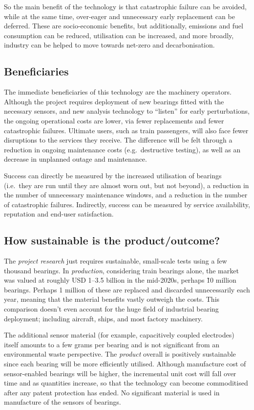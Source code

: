 \documentclass[runningheads]{llncs}
\begin{document}
    So the main benefit of the technology is that catastrophic failure can be avoided, while at the same time, over-eager and unnecessary early replacement can be deferred. These are socio-economic benefits, but additionally, emissions and fuel consumption can be reduced, utilisation can be increased, and more broadly, industry can be helped to move towards net-zero and decarbonisation. 
\subsection{Beneficiaries}
    The immediate beneficiaries of this technology are the machinery operators. Although the project requires deployment of new bearings fitted with the necessary sensors, and new analysis technology to \enquote{listen} for early perturbations, the ongoing operational costs are lower, via fewer replacements and fewer catastrophic failures. Ultimate users, such as train passengers, will also face fewer disruptions to the services they receive. The difference will be felt through a reduction in ongoing maintenance costs (e.g.\ destructive testing), as well as an decrease in unplanned outage and maintenance.

    Success can directly be measured by the increased utilisation of bearings (i.e.\ they are run until they are almost worn out, but not beyond), a reduction in the number of unnecessary maintenance windows, and a reduction in the number of catastrophic failures. Indirectly, success can be measured by service availability, reputation and end-user satisfaction.
\subsection{How sustainable is the product/outcome?}
    The \emph{project research} just requires sustainable, small-scale tests using a few thousand bearings. In \emph{production}, considering train bearings alone, the market was valued at roughly USD 1–3.5 billion in the mid-2020s, perhaps \~10 million bearings. Perhaps 1 million of these are replaced and discarded unnecessarily each year, meaning that the material benefits vastly outweigh the costs. This comparison doesn't even account for the huge field of industrial bearing deployment; including aircraft, ships, and most factory machinery. 
    
    The additional sensor material (for example, capacitively coupled electrodes) itself amounts to a few grams per bearing and is not significant from an environmental waste perspective. The \emph{product} overall is positively sustainable since each bearing will be more efficiently utilised. Although manufacture cost of sensor-enabled bearings will be higher, the incremental unit cost will fall over time and as quantities increase, so that the technology can become commoditised after any patent protection has ended. No significant material is used in manufacture of the sensors of bearings.
    
\end{document}
